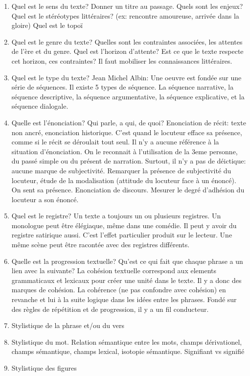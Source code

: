 \documentclass[a4paper]{report}
\theoremstyle{definition}
\theoremstyle{remark}
\begin{document}
\begin{enumerate}
    \item Quel est le sens du texte? Donner un titre au passage. Quels sont les enjeux? Quel est le stéréotypes littéraires? (ex: rencontre amoureuse, arrivée dans la gloire) Quel est le topoï
    \item Quel est le genre du texte? Quelles sont les contraintes associées, les attentes de l'ère et du genre. Quel est l'horizon d'attente? Est ce que le texte respecte cet horizon, ces contraintes? Il faut mobiliser les connaissances littéraires. 
    \item Quel est le type du texte? Jean Michel Albin: Une oeuvre est fondée sur une série de séquences. Il existe 5 types de séquence. La séquence narrative, la séquence descriptive, la séquence argumentative, la séquence explicative, et la séquence dialogale. 
    \item Quelle est l'énonciation? Qui parle, a qui, de quoi? Enonciation de récit: texte non ancré, enonciation historique. C'est quand le locuteur efface sa présence, comme si le récit se déroulait tout seul. Il n'y a aucune référence à la situation d'énonciation. On le reconnait à l'utilisation de la 3eme personne, du passé simple ou du présent de narration. Surtout, il n'y a pas de déictique: aucune marque de subjectivité. Remarquer la présence de subjectivité du locuteur, étude de la modalisation (attitude du locuteur face à un énoncé). On sent sa présence. Enonciation de discours. Mesurer le degré d'adhésion du locuteur a son énoncé.
    \item Quel est le registre? Un texte a toujours un ou plusieurs registres. Un monologue peut être élégiaque, même dans une comédie. Il peut y avoir du registre satirique aussi. C'est l'effet particulier produit sur le lecteur. Une même scène peut être racontée avec des registres différents. 
    \item Quelle est la progression textuelle? Qu'est ce qui fait que chaque phrase a un lien avec la suivante? La cohésion textuelle correspond aux elements grammaticaux et lexicaux pour créer une unité dans le texte. Il y a donc des marques de cohésion. La cohérence (ne pas confondre avec cohésion) en revanche et lui à la suite logique dans les idées entre les phrases. Fondé sur des règles de répétition et de progression, il y a un fil conducteur. 
    \item Stylistique de la phrase et/ou du vers
    \item Stylistique du mot. Relation sémantique entre les mots, champs dérivationel, champs sémantique, champs lexical, isotopie sémantique. Signifiant vs signifié
    \item Stylistique des figures
\end{enumerate}
\end{document}
